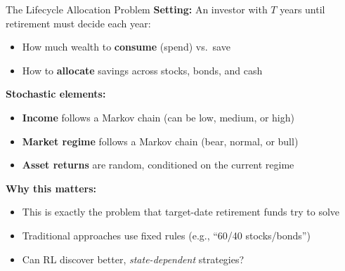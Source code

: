 \documentclass[aspectratio=169, 11pt]{beamer}
\begin{document}
\begin{frame}{The Lifecycle Allocation Problem}
\textbf{Setting:} An investor with $T$ years until retirement must decide each year:
\begin{itemize}
    \item How much wealth to \textbf{consume} (spend) vs.\ save
    \item How to \textbf{allocate} savings across stocks, bonds, and cash
\end{itemize}

\vspace{0.5em}
\textbf{Stochastic elements:}
\begin{itemize}
    \item \textbf{Income} follows a Markov chain (can be low, medium, or high)
    \item \textbf{Market regime} follows a Markov chain (bear, normal, or bull)
    \item \textbf{Asset returns} are random, conditioned on the current regime
\end{itemize}

\vspace{0.5em}
\textbf{Why this matters:}
\begin{itemize}
    \item This is exactly the problem that target-date retirement funds try to solve
    \item Traditional approaches use fixed rules (e.g., ``60/40 stocks/bonds'')
    \item Can RL discover better, \textit{state-dependent} strategies?
\end{itemize}
\end{frame}
\end{document}
